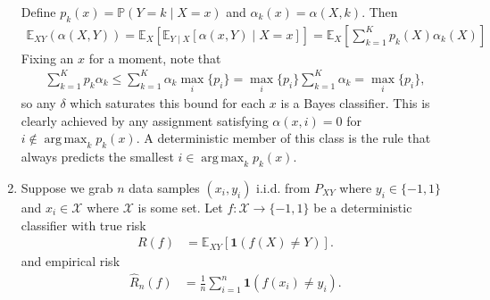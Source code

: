 \documentclass[11pt,letterpaper]{article}
\DeclareMathOperator*{\argmax}{arg\,max}
\numberwithin{equation}{section}
\numberwithin{figure}{section}
\begin{document}
\begin{enumerate}
	Define $p_k(x) = \mathbb{P}(Y=k \mid X=x)$ and $\alpha_k(x) = \alpha(X,k)$. Then
	\begin{align*}
		\mathbb{E}_{XY}(\alpha(X,Y)) = \mathbb{E}_X\left[\mathbb{E}_{Y\mid X} \left[\alpha(x,Y) \mid X=x\right]\right] = \mathbb{E}_X\left[\sum_{k=1}^K p_k(X) \alpha_k(X)\right]
	\end{align*}
	Fixing an $x$ for a moment, note that
	\begin{align*}
		\sum_{k=1}^K p_k \alpha_k \leq \sum_{k=1}^K \alpha_k \max_i \{p_i\} = \max_i \{p_i\} \sum_{k=1}^K \alpha_k = \max_i \{p_i\},
	\end{align*}
	so any $\delta$ which saturates this bound for each $x$ is a Bayes classifier. This is clearly achieved by any assignment satisfying $\alpha(x,i) = 0$ for $i \notin \argmax_{k} p_k(x)$. A deterministic member of this class is the rule that always predicts the smallest $i \in \argmax_k p_k(x)$.


















	\item Suppose we grab $n$ data samples $(x_i,y_i)$ i.i.d. from $P_{XY}$ where $y_i \in \{-1,1\}$ and $x_i \in \mathcal{X}$ where $\mathcal{X}$ is some set. Let $f: \mathcal{X} \to \{-1,1\}$ be a deterministic classifier with true risk
	\begin{align*}
		R(f) &= \mathbb{E}_{XY}\left[\bm{1}(f(X) \neq Y)\right].
	\end{align*}
	and empirical risk
	\begin{align*}
		\hat{R}_n(f) &= \frac{1}{n} \sum_{i=1}^n \bm{1}(f(x_i) \neq y_i).
	\end{align*}





\end{enumerate}
\end{document}
